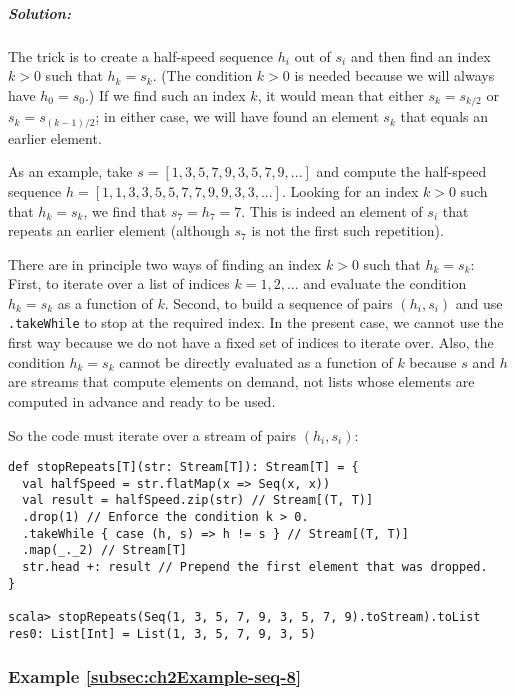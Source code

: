 \subparagraph{Solution:}

The trick is to create a half-speed sequence $h_{i}$ out of $s_{i}$
and then find an index $k>0$ such that $h_{k}=s_{k}$. (The condition
$k>0$ is needed because we will always have $h_{0}=s_{0}$.) If we
find such an index $k$, it would mean that either $s_{k}=s_{k/2}$
or $s_{k}=s_{\left(k-1\right)/2}$; in either case, we will have found
an element $s_{k}$ that equals an earlier element. 

As an example, take $s=\left[1,3,5,7,9,3,5,7,9,...\right]$ and compute
the half-speed sequence $h=\left[1,1,3,3,5,5,7,7,9,9,3,3,...\right]$.
Looking for an index $k>0$ such that $h_{k}=s_{k}$, we find that
$s_{7}=h_{7}=7$. This is indeed an element of $s_{i}$ that repeats
an earlier element (although $s_{7}$ is not the first such repetition).

There are in principle two ways of finding an index $k>0$ such that
$h_{k}=s_{k}$: First, to iterate over a list of indices $k=1,2,...$
and evaluate the condition $h_{k}=s_{k}$ as a function of $k$. Second,
to build a sequence of pairs $\left(h_{i},s_{i}\right)$ and use \lstinline!.takeWhile!
to stop at the required index. In the present case, we cannot use
the first way because we do not have a fixed set of indices to iterate
over. Also, the condition $h_{k}=s_{k}$ cannot be directly evaluated
as a function of $k$ because $s$ and $h$ are streams that compute
elements on demand, not lists whose elements are computed in advance
and ready to be used. 

So the code must iterate over a stream of pairs $\left(h_{i},s_{i}\right)$:
\begin{lstlisting}
def stopRepeats[T](str: Stream[T]): Stream[T] = {
  val halfSpeed = str.flatMap(x => Seq(x, x))
  val result = halfSpeed.zip(str) // Stream[(T, T)]
  .drop(1) // Enforce the condition k > 0.
  .takeWhile { case (h, s) => h != s } // Stream[(T, T)]
  .map(_._2) // Stream[T]
  str.head +: result // Prepend the first element that was dropped.
}

scala> stopRepeats(Seq(1, 3, 5, 7, 9, 3, 5, 7, 9).toStream).toList
res0: List[Int] = List(1, 3, 5, 7, 9, 3, 5)
\end{lstlisting}

\subsubsection{Example \label{subsec:ch2Example-seq-8}\ref{subsec:ch2Example-seq-8}}

